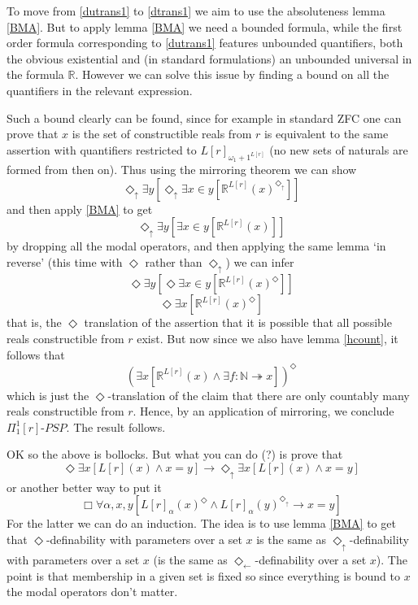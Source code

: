 \documentclass{article}
\theoremstyle{definition}
\newcommand{\du}{\Diamond_\uparrow}
\newcommand{\dl}{\Diamond_\leftarrow}
\begin{document}
To move from \eqref{dutrans1} to \eqref{dtrans1} we aim to use the absoluteness 
lemma \ref{BMA}. But to apply lemma \ref{BMA} we need a bounded formula, while the 
first order formula corresponding to \eqref{dutrans1} features unbounded quantifiers, 
both the obvious existential and (in standard formulations) an unbounded universal 
in the formula $\mathbb{R}$. However we can solve this issue by finding a bound 
on all the quantifiers in the relevant expression.

Such a bound clearly can be found, since for example 
in standard ZFC one can prove that $x$ is the set of constructible reals from $r$ 
is equivalent to the same assertion with quantifiers restricted to
$L[r]_{\omega_1 + 1^{L[r]}}$ (no new sets of naturals are formed from then on). 
Thus using the mirroring theorem we can show
\begin{equation}
    \du \exists y[ \du \exists x \in y[\mathbb{R}^{L[r]}(x)^{\du} ]]
\end{equation}
and then apply \ref{BMA} to get 
\begin{equation}
    \du \exists y[ \exists x \in y[\mathbb{R}^{L[r]}(x) ]]
\end{equation}
by dropping all the modal operators, and then applying the same lemma `in reverse' 
(this time with $\Diamond$ rather than $\du$) we can infer
\begin{equation}
    \Diamond \exists y[ \Diamond \exists x \in y[\mathbb{R}^{L[r]}(x)^\Diamond ]]
\end{equation}
\begin{equation}
    \Diamond \exists x[\mathbb{R}^{L[r]}(x)^\Diamond]
\end{equation}
that is, the $\Diamond$ translation of the assertion that it is possible that all possible 
reals constructible from $r$ exist. But now since we also have lemma \ref{hcount}, it follows that 
\begin{equation}
    (\exists x[\mathbb{R}^{L[r]}(x) \wedge \exists f : \mathbb{N} \twoheadrightarrow x])^\Diamond
\end{equation}
which is just the $\Diamond$-translation of the claim that there are only countably many 
reals constructible from $r$. Hence, by an application of mirroring, we conclude $\Pi_1^1[r]$-$PSP$.
The result follows.

OK so the above is bollocks. But what you can do (?) is prove that 
\[\Diamond \exists x[ L[r](x) \wedge x = y] \rightarrow \du \exists x [L[r](x) \wedge x = y]\]
or another better way to put it
\[ \Box \forall \alpha, x, y [ L[r]_\alpha (x) ^\Diamond \wedge L[r]_\alpha (y)^{\du} \rightarrow x = y] \]
For the latter we can do an induction. The idea is to use lemma \ref{BMA}
to get that $\Diamond$-definability with parameters over a set $x$ is the same 
as $\du$-definability with parameters over a set $x$ (is the same as $\dl$-definability over a set $x$).
The point is that membership in a given set is fixed so since everything is bound 
to $x$ the modal operators don't matter.
\end{document}
